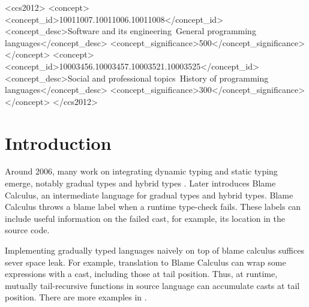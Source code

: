\documentclass[acmsmall,review,anonymous]{acmart}\settopmatter{printfolios=true,printccs=false,printacmref=false}
\begin{document}
\begin{CCSXML}
<ccs2012>
<concept>
<concept_id>10011007.10011006.10011008</concept_id>
<concept_desc>Software and its engineering~General programming languages</concept_desc>
<concept_significance>500</concept_significance>
</concept>
<concept>
<concept_id>10003456.10003457.10003521.10003525</concept_id>
<concept_desc>Social and professional topics~History of programming languages</concept_desc>
<concept_significance>300</concept_significance>
</concept>
</ccs2012>
\end{CCSXML}





\maketitle


\section{Introduction}

Around 2006, many work on integrating dynamic typing and static typing emerge, 
notably gradual types \cite{siek2006gradual} and hybrid types 
\cite{flanagan2006hybrid}. 
Later \citet{wadler2009well} introduces Blame Calculus, an intermediate 
language for gradual types and hybrid types. 
Blame Calculus throws a blame label when a runtime type-check fails.
These labels can include useful information on the failed cast, for example, 
its location in the source code.

Implementing gradually typed languages naively on top of blame calculus 
suffices sever space leak.
For example, translation to Blame Calculus can wrap some expressions with a 
cast, including those at tail position. Thus, at runtime, mutually 
tail-recursive functions in source language can accumulate casts at tail 
position. There are more examples in \citet{herman2010space}.
\end{document}
